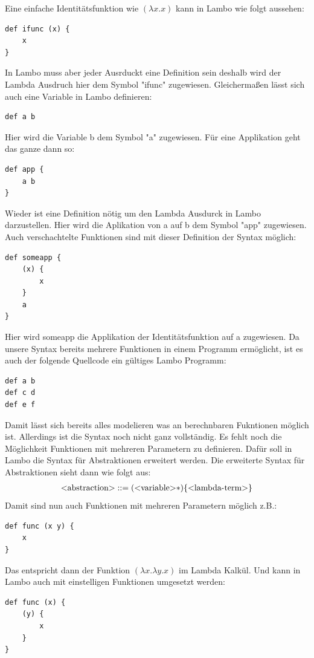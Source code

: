 \documentclass[ngerman]{article}
\newcommand{\doublelinebreak}{\par\vspace{\baselineskip}}
\begin{document}
Eine einfache Identitätsfunktion wie $(\lambda x.x)$ kann in Lambo wie folgt aussehen:
\begin{lstlisting}
def ifunc (x) {
    x
}
\end{lstlisting}
In Lambo muss aber jeder Ausrduckt eine Definition sein deshalb wird der Lambda Ausdruch hier dem Symbol "ifunc" zugewiesen. Gleichermaßen lässt sich auch eine Variable in Lambo definieren:
\begin{lstlisting}
def a b
\end{lstlisting}
Hier wird die Variable b dem Symbol "a" zugewiesen. Für eine Applikation geht das ganze dann so:
\begin{lstlisting}
def app {
    a b
}
\end{lstlisting}
Wieder ist eine Definition nötig um den Lambda Ausdurck in Lambo darzustellen. Hier wird die Aplikation von a auf b dem Symbol "app" zugewiesen. Auch verschachtelte Funktionen sind mit dieser Definition der Syntax möglich:
\begin{lstlisting}
def someapp {
    (x) {
        x
    }
    a
}
\end{lstlisting}
Hier wird someapp die Applikation der Identitätsfunktion auf a zugewiesen. 
Da unsere Syntax bereits mehrere Funktionen in einem Programm ermöglicht, ist es auch der folgende Quellcode ein gültiges Lambo Programm:
\begin{lstlisting}
def a b
def c d
def e f
\end{lstlisting}
\doublelinebreak
Damit lässt sich bereits alles modelieren was an berechnbaren Fukntionen möglich ist. Allerdings ist die Syntax noch nicht ganz vollständig. Es fehlt noch die Möglichkeit Funktionen mit mehreren Parametern zu definieren. Dafür soll in Lambo die Syntax für Abstraktionen erweitert werden. Die erweiterte Syntax für Abstraktionen sieht dann wie folgt aus:
\begin{align*}
    \text{\textless abstraction\textgreater} & ::= (\text{\textless variable\textgreater}*)\{\text{\textless lambda-term\textgreater}\}\\
\end{align*}
Damit sind nun auch Funktionen mit mehreren Parametern möglich z.B.:
\begin{lstlisting}
def func (x y) {
    x
}
\end{lstlisting}
Das entspricht dann der Funktion $(\lambda x.\lambda y.x)$ im Lambda Kalkül. Und kann in Lambo auch mit einstelligen Funktionen umgesetzt werden:
\begin{lstlisting}
def func (x) {
    (y) {
        x
    }
}
\end{lstlisting}
\end{document}
